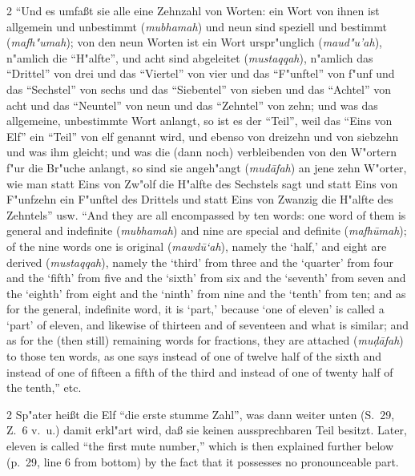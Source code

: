 \documentclass[10pt,a4paper]{article}
\renewcommand{\switchcolumn}{\syncronize\nointerlineskip\columnbreak}
\newcommand{\enquote}[1]{``#1''}
\begin{document}
\begin{paracol}{2}
\enquote{Und es umfa\ss{}t sie alle eine Zehnzahl von Worten: ein Wort von ihnen ist allgemein und unbestimmt (\textit{mubhamah}) und neun sind speziell und bestimmt (\textit{mafh"umah}); von den neun Worten ist ein Wort urspr"unglich (\textit{maud"u'ah}), n"amlich die \enquote{H"alfte}, und acht sind abgeleitet (\textit{mustaqqah}), n"amlich das \enquote{Drittel} von drei und das \enquote{Viertel} von vier und das \enquote{F"unftel} von f"unf und das \enquote{Sechstel} von sechs und das \enquote{Siebentel} von sieben und das \enquote{Achtel} von acht und das \enquote{Neuntel} von neun und das \enquote{Zehntel} von zehn; und was das allgemeine, unbestimmte Wort anlangt, so ist es der \enquote{Teil}, weil das \enquote{Eins von Elf} ein \enquote{Teil} von elf genannt wird, und ebenso von dreizehn und von siebzehn und was ihm gleicht; und was die (dann noch) verbleibenden von den W"ortern f"ur die Br"uche anlangt, so sind sie angeh"angt (\textit{mud\=afah}) an jene zehn W"orter, wie man statt Eins von Zw"olf die H"alfte des Sechstels sagt und statt Eins von F"unfzehn ein F"unftel des Drittels und statt Eins von Zwanzig die H"alfte des Zehntels} usw.
\switchcolumn
``And they are all encompassed by ten words: one word of them is general and indefinite (\textit{mubhamah}) and nine are special and definite (\textit{mafh\=umah}); of the nine words one is original (\textit{mawd\=u`ah}), namely the `half,' and eight are derived (\textit{mustaqqah}), namely the `third' from three and the `quarter' from four and the `fifth' from five and the `sixth' from six and the `seventh' from seven and the `eighth' from eight and the `ninth' from nine and the `tenth' from ten; and as for the general, indefinite word, it is `part,' because `one of eleven' is called a `part' of eleven, and likewise of thirteen and of seventeen and what is similar; and as for the (then still) remaining words for fractions, they are attached (\textit{mu\d{d}\=afah}) to those ten words, as one says instead of one of twelve half of the sixth and instead of one of fifteen a fifth of the third and instead of one of twenty half of the tenth,'' etc.
\end{paracol}

\begin{paracol}{2}
Sp"ater hei\ss{}t die Elf \enquote{die erste stumme Zahl}, was dann weiter unten (S.\ 29, Z.\ 6 v.\ u.) damit erkl"art wird, da\ss{} sie keinen aussprechbaren Teil besitzt.
\switchcolumn
Later, eleven is called ``the first mute number,'' which is then explained further below (p.\ 29, line 6 from bottom) by the fact that it possesses no pronounceable part.
\end{paracol}
\end{document}
